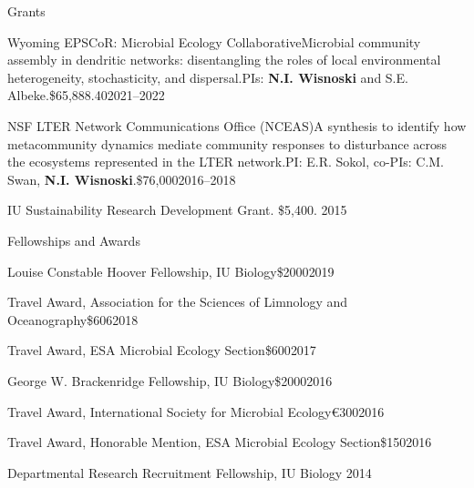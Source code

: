 \documentclass{resume} %
\begin{document}
\begin{rSection}{Grants}

\begin{Grant}{Wyoming EPSCoR: Microbial Ecology Collaborative}{Microbial community assembly in dendritic networks: disentangling the roles of local environmental heterogeneity, stochasticity, and dispersal.}{PIs: {\bf N.I. Wisnoski} and S.E. Albeke.}{\$65,888.40}{2021--2022}
\end{Grant}

\begin{Grant}{NSF LTER Network Communications Office (NCEAS)}{A synthesis to identify how metacommunity dynamics mediate community responses to disturbance across the ecosystems represented in the LTER network.}{PI: E.R. Sokol, co-PIs: C.M. Swan, {\bf N.I. Wisnoski}.}{\$76,000}{2016--2018}
\end{Grant}


IU Sustainability Research Development Grant. \$5,400. 2015


\end{rSection}

\bigskip

\begin{rSection}{Fellowships and Awards}

\begin{Award}{Louise Constable Hoover Fellowship, IU Biology}{\$2000}{2019}
\end{Award}

\begin{Award}{Travel Award, Association for the Sciences of Limnology and Oceanography}{\$606}{2018}
\end{Award}

\begin{Award}{Travel Award, ESA Microbial Ecology Section}{\$600}{2017}
\end{Award}

\begin{Award}{George W. Brackenridge Fellowship, IU Biology}{\$2000}{2016}
\end{Award}

\begin{Award}{Travel Award, International Society for Microbial Ecology}{\euro{}300}{2016}
\end{Award}

\begin{Award}{Travel Award, Honorable Mention, ESA Microbial Ecology Section}{\$150}{2016}
\end{Award}

\begin{Award}{Departmental Research Recruitment Fellowship, IU Biology}{ }{2014}
\end{Award}

\end{rSection}
\end{document}
